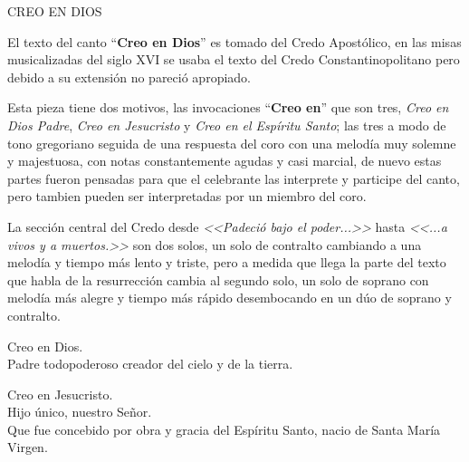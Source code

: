 \documentclass[12pt, letterpaper]{report}
\begin{document}



    \begin{center}
      {\large CREO EN DIOS}
    \end{center}

    El texto del canto ``\textbf{Creo en Dios}'' es tomado del Credo Apost\'olico, en las misas musicalizadas del siglo XVI se usaba el texto del Credo Constantinopolitano pero debido a su extensi\'on no pareci\'o apropiado.

    Esta pieza tiene dos motivos, las invocaciones ``\textbf{Creo en}'' que son tres, \textit{Creo en Dios Padre}, \textit{Creo en Jesucristo} y \textit{Creo en el Esp\'iritu Santo}; las tres a modo de tono gregoriano seguida de una respuesta del coro con una melod\'ia muy solemne y majestuosa, con notas constantemente agudas y casi marcial, de nuevo estas partes fueron pensadas para que el celebrante las interprete y participe del canto, pero tambien pueden ser interpretadas por un miembro del coro.

    La secci\'on central del Credo desde \textit{<<Padeci\'o bajo el poder...>>} hasta \textit{<<...a vivos y a muertos.>>} son dos solos, un solo de contralto cambiando a una melod\'ia y tiempo m\'as lento y triste, pero a medida que llega la parte del texto que habla de la resurrecci\'on cambia al segundo solo, un solo de soprano con melod\'ia m\'as alegre y tiempo m\'as r\'apido desembocando en un d\'uo de soprano y contralto.

    \noindent
    Creo en Dios.\\
    Padre todopoderoso creador del cielo y de la tierra.

    \noindent
    Creo en Jesucristo.\\
    Hijo \'unico, nuestro Se\~nor.\\
    Que fue concebido por obra y gracia del Esp\'iritu Santo, nacio de Santa Mar\'ia Virgen.
\end{document}
